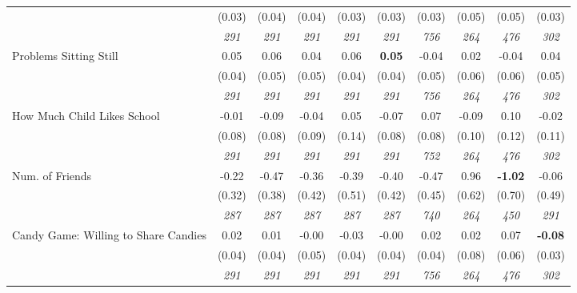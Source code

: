 \begin{tabular}{l c c c c c c c c c}
& (0.03) & (0.04) & (0.04) & (0.03) & (0.03) & (0.03) & (0.05) & (0.05) & (0.03) \\
& \textit{ 291 } & \textit{ 291 } & \textit{ 291 } & \textit{ 291 } & \textit{ 291 } & \textit{ 756 } & \textit{ 264 } & \textit{ 476 } & \textit{ 302 } \\
Problems Sitting Still & 0.05 & 0.06 & 0.04 & 0.06 & \textbf{0.05} & -0.04 & 0.02 & -0.04 & 0.04 \\
& (0.04) & (0.05) & (0.05) & (0.04) & (0.04) & (0.05) & (0.06) & (0.06) & (0.05) \\
& \textit{ 291 } & \textit{ 291 } & \textit{ 291 } & \textit{ 291 } & \textit{ 291 } & \textit{ 756 } & \textit{ 264 } & \textit{ 476 } & \textit{ 302 } \\
How Much Child Likes School & -0.01 & -0.09 & -0.04 & 0.05 & -0.07 & 0.07 & -0.09 & 0.10 & -0.02 \\
& (0.08) & (0.08) & (0.09) & (0.14) & (0.08) & (0.08) & (0.10) & (0.12) & (0.11) \\
& \textit{ 291 } & \textit{ 291 } & \textit{ 291 } & \textit{ 291 } & \textit{ 291 } & \textit{ 752 } & \textit{ 264 } & \textit{ 476 } & \textit{ 302 } \\
Num. of Friends & -0.22 & -0.47 & -0.36 & -0.39 & -0.40 & -0.47 & 0.96 & \textbf{ -1.02 } & -0.06 \\
& (0.32) & (0.38) & (0.42) & (0.51) & (0.42) & (0.45) & (0.62) & (0.70) & (0.49) \\
& \textit{ 287 } & \textit{ 287 } & \textit{ 287 } & \textit{ 287 } & \textit{ 287 } & \textit{ 740 } & \textit{ 264 } & \textit{ 450 } & \textit{ 291 } \\
Candy Game: Willing to Share Candies & 0.02 & 0.01 & -0.00 & -0.03 & -0.00 & 0.02 & 0.02 & 0.07 & \textbf{-0.08} \\
& (0.04) & (0.04) & (0.05) & (0.04) & (0.04) & (0.04) & (0.08) & (0.06) & (0.03) \\
& \textit{ 291 } & \textit{ 291 } & \textit{ 291 } & \textit{ 291 } & \textit{ 291 } & \textit{ 756 } & \textit{ 264 } & \textit{ 476 } & \textit{ 302 } \\
\bottomrule
\end{tabular}
